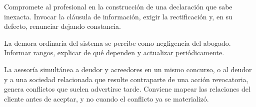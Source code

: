 {Compromete al profesional en la construcción de una declaración que sabe inexacta.}
{Invocar la cláusula de información, exigir la rectificación y, en su defecto, renunciar
dejando constancia.}

{La demora ordinaria del sistema se percibe como negligencia del abogado.}
{Informar rangos, explicar de qué dependen y actualizar periódicamente.}

\begin{alerta}
La asesoría simultánea a deudor y acreedores en un mismo concurso, o al deudor y a una
sociedad relacionada que resulte contraparte de una acción revocatoria, genera conflictos
que suelen advertirse tarde. Conviene mapear las relaciones del cliente antes de aceptar,
y no cuando el conflicto ya se materializó.
\end{alerta}
